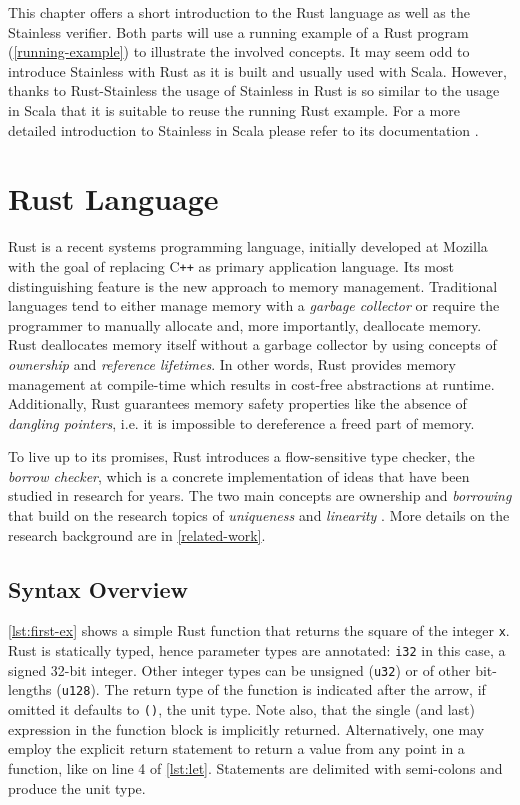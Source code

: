This chapter offers a short introduction to the Rust language as well as the
Stainless verifier. Both parts will use a running example of a Rust program
(\autoref{running-example}) to illustrate the involved concepts. It may seem odd
to introduce Stainless with Rust  as it is built and usually used with Scala.
However, thanks to Rust-Stainless the  usage of Stainless in Rust is so similar
to the usage in Scala that it is suitable  to reuse the running Rust example.
For a more detailed introduction to Stainless in Scala please refer to its
documentation \cite{stainless-doc}.

\section{Rust Language}

Rust \cite{rust2, rust1} is a recent systems programming language, initially
developed at Mozilla with the goal of replacing C\texttt{++} as primary
application language. Its most distinguishing feature is the new approach to
memory management. Traditional languages tend to either manage memory with a
\emph{garbage collector} or require the programmer to manually allocate and,
more importantly, deallocate memory. Rust deallocates memory itself without a
garbage collector by using concepts of \emph{ownership} and \emph{reference
lifetimes}. In other words, Rust provides memory management at compile-time
which results in cost-free abstractions at runtime. Additionally, Rust
guarantees memory safety properties like  the absence of \emph{dangling
pointers}, i.e. it is impossible to dereference a freed part of memory.

To live up to its promises, Rust introduces a flow-sensitive type checker, the
\emph{borrow checker}, which is a concrete implementation of ideas that have
been studied in research for years. The two main concepts are ownership
\cite{ownership-types} and \emph{borrowing} that build on the research topics of
\emph{uniqueness} \cite{alias-burying} and \emph{linearity}
\cite{Wadler90lineartypes, once-upon-a-type}. More details on the research
background are in \autoref{related-work}.


\subsection{Syntax Overview}

\autoref{lst:first-ex} shows a simple Rust function that returns the square of
the integer \lstinline!x!. Rust is statically typed, hence parameter types are
annotated: \lstinline!i32! in this case, a signed 32-bit integer. Other integer
types can be unsigned (\lstinline!u32!) or of other bit-lengths
(\lstinline!u128!). The return type of the function is indicated after the
arrow, if omitted it defaults to \lstinline!()!, the unit type. Note also, that
the single (and last) expression in the function block is implicitly returned.
Alternatively, one may employ the explicit return statement to return a value
from any point in a function, like on line 4 of \autoref{lst:let}. Statements
are delimited with semi-colons and produce the unit type.

